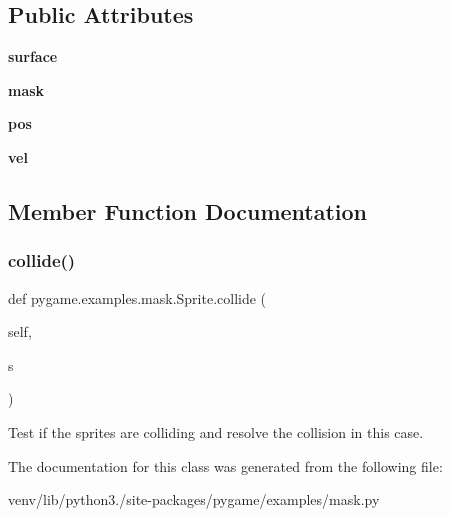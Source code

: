 \subsection*{Public Attributes}
\begin{DoxyCompactItemize}
\item 
\mbox{\label{classpygame_1_1examples_1_1mask_1_1_sprite_a25e6cc83859da825463b951d95097c44}} 
{\bfseries surface}
\item 
\mbox{\label{classpygame_1_1examples_1_1mask_1_1_sprite_afd9a608cf46f8ca44e224b92ad828da3}} 
{\bfseries mask}
\item 
\mbox{\label{classpygame_1_1examples_1_1mask_1_1_sprite_a77e6792c021722801aa3d70ee9f1d601}} 
{\bfseries pos}
\item 
\mbox{\label{classpygame_1_1examples_1_1mask_1_1_sprite_ab5ebca22a709ef1d25ff176cd5e6ec23}} 
{\bfseries vel}
\end{DoxyCompactItemize}


\subsection{Member Function Documentation}
\mbox{\label{classpygame_1_1examples_1_1mask_1_1_sprite_a34b356ed777771ec89a1e474341d8484}} 
\subsubsection{\texorpdfstring{collide()}{collide()}}
{\footnotesize\ttfamily def pygame.\+examples.\+mask.\+Sprite.\+collide (\begin{DoxyParamCaption}\item[{}]{self,  }\item[{}]{s }\end{DoxyParamCaption})}

\begin{DoxyVerb}Test if the sprites are colliding and
resolve the collision in this case.\end{DoxyVerb}
 

The documentation for this class was generated from the following file\+:\begin{DoxyCompactItemize}
\item 
venv/lib/python3./site-\/packages/pygame/examples/mask.\+py\end{DoxyCompactItemize}
